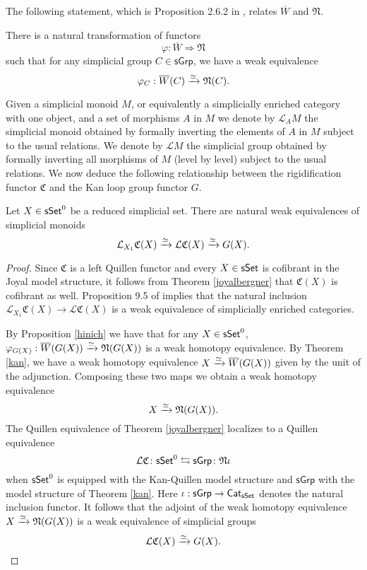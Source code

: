 The following statement, which is Proposition 2.6.2 in \cite{Hinich}, relates $\overline{W}$ and $\mathfrak{N}$.

\begin{proposition}\label{hinich} There is a natural transformation of functors $$\varphi: \overline{W} \Longrightarrow \mathfrak{N}$$ such that for any simplicial group $C \in \mathsf{sGrp}$, we have a weak equivalence
$$\varphi_C: \overline{W}(C) \xrightarrow{\simeq} \mathfrak{N}(C).$$
\end{proposition} 

 Given a simplicial monoid $M$, or equivalently a simplicially enriched category with one object, and a set of morphisms $A$ in $M$ we denote by $\mathcal{L}_A M$ the simplicial monoid obtained by formally inverting the elements of $A$ in $M$ subject to the usual relations. We denote by $\mathcal{L}M$ the simplicial group obtained by formally inverting all morphisms of $M$ (level by level) subject to the usual relations. We now deduce the following relationship between the rigidification functor $\mathfrak{C}$ and the Kan loop group functor $G$.

\begin{proposition} Let $X \in \mathsf{sSet}^0$ be a reduced simplicial set. There are natural weak equivalences of simplicial monoids
$$\mathcal{L}_{X_1} \mathfrak{C}(X) \xrightarrow{\simeq} \mathcal{L}\mathfrak{C}(X) \xrightarrow{\simeq} G(X).$$
\end{proposition}

\begin{proof}
Since $\mathfrak{C}$ is a left Quillen functor and every $X \in \mathsf{sSet}$ is cofibrant in the Joyal model structure, it follows from Theorem \ref{joyalbergner} that $\mathfrak{C}(X)$ is cofibrant as well. Proposition 9.5 of \cite{Dwyer-Kan} implies that the natural inclusion $\mathcal{L}_{X_1} \mathfrak{C}(X) \to \mathcal{L}\mathfrak{C}(X)$ is a weak equivalence of simplicially enriched categories. 

By Proposition \ref{hinich} we have that for any $X \in \mathsf{sSet}^0$, $\varphi_{G(X)}: \overline{W}(G(X)) \xrightarrow{\simeq} \mathfrak{N}(G(X))$ is a weak homotopy equivalence. By Theorem \ref{kan}, we have a weak homotopy equivalence $X \xrightarrow{\simeq} \overline{W}(G(X))$ given by the unit of the adjunction. Composing these two maps we obtain a weak homotopy equivalence
$$X \xrightarrow{\simeq} \mathfrak{N}(G(X)).$$ 
The Quillen equivalence of Theorem \ref{joyalbergner} localizes to a Quillen equivalence
$$\mathcal{L} \mathfrak{C} \colon \mathsf{sSet}^0 \leftrightarrows \mathsf{sGrp} \colon \mathfrak{N}\iota$$
when $\mathsf{sSet}^0$ is equipped with the Kan-Quillen model structure and $\mathsf{sGrp}$ with the model structure of Theorem \ref{kan}. Here $\iota: \mathsf{sGrp} \to \mathsf{Cat}_{\mathsf{sSet}}$ denotes the natural inclusion functor. It follows that the adjoint of the weak homotopy equivalence $X \xrightarrow{\simeq} \mathfrak{N}(G(X))$ is a weak equivalence of simplicial groups
$$\mathcal{L}\mathfrak{C}(X) \xrightarrow{\simeq} G(X).$$ 
\end{proof}

